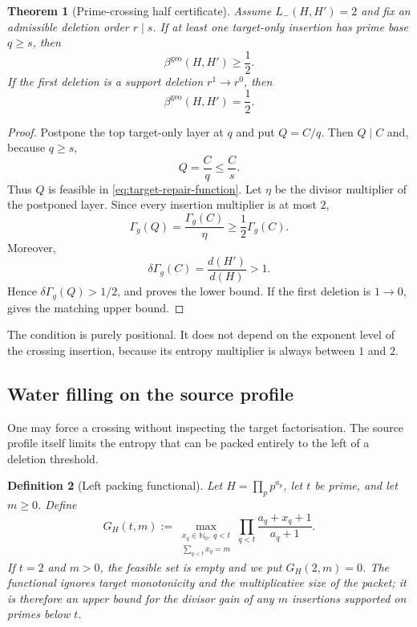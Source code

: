 \documentclass[11pt]{article}
\numberwithin{equation}{section}
\theoremstyle{blueplain}
\newtheorem{theorem}{Theorem}[section]
\theoremstyle{bluedef}
\newtheorem{definition}[theorem]{Definition}
\newcommand{\N}{\mathbb N}
\newcommand{\betageo}{\beta^{\mathrm{geo}}}
\begin{document}
\begin{theorem}[Prime-crossing half certificate]
\label{thm:prime-crossing}
Assume $L_-(H,H')=2$ and fix an admissible deletion order $r\mid s$.  If at least one target-only insertion has prime base $q\ge s$, then
\begin{equation}
 \boxed{\betageo(H,H')\ge\frac12.}
 \label{eq:prime-crossing-half}
\end{equation}
If the first deletion is a support deletion $r^1\to r^0$, then
\begin{equation}
 \boxed{\betageo(H,H')=\frac12.}
 \label{eq:prime-crossing-equality}
\end{equation}
\end{theorem}

\begin{proof}
Postpone the top target-only layer at $q$ and put $Q=C/q$.  Then $Q\mid C$ and, because $q\ge s$,
\[
 Q=\frac Cq\le\frac Cs.
\]
Thus $Q$ is feasible in \eqref{eq:target-repair-function}.  Let $\eta$ be the divisor multiplier of the postponed layer.  Since every insertion multiplier is at most $2$,
\[
 \Gamma_g(Q)=\frac{\Gamma_g(C)}{\eta}
 \ge\frac12\Gamma_g(C).
\]
Moreover,
\[
 \delta\Gamma_g(C)=\frac{d(H')}{d(H)}>1.
\]
Hence $\delta\Gamma_g(Q)>1/2$, and  proves the lower bound.  If the first deletion is $1\to0$,  gives the matching upper bound.
\end{proof}

The condition is purely positional.  It does not depend on the exponent level of the crossing insertion, because its entropy multiplier is always between $1$ and $2$.

\subsection{Water filling on the source profile}

One may force a crossing without inspecting the target factorisation.  The source profile itself limits the entropy that can be packed entirely to the left of a deletion threshold.

\begin{definition}[Left packing functional]
\label{def:left-packing}
Let $H=\prod_p p^{a_p}$, let $t$ be prime, and let $m\ge0$.  Define
\begin{equation}
 \boxed{
 G_H(t,m):=
 \max_{\substack{x_q\in\N_0,\ q<t\\\sum_{q<t}x_q=m}}
 \prod_{q<t}\frac{a_q+x_q+1}{a_q+1}.}
 \label{eq:left-packing-functional}
\end{equation}
If $t=2$ and $m>0$, the feasible set is empty and we put $G_H(2,m)=0$.  The functional ignores target monotonicity and the multiplicative size of the packet; it is therefore an upper bound for the divisor gain of any $m$ insertions supported on primes below $t$.
\end{definition}
\end{document}
